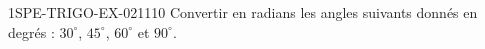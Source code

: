 \begin{exercice}{1SPE-TRIGO-EX-021}{1}{10}
Convertir en radians les angles suivants donnés en degrés : $30^\circ$, $45^\circ$, $60^\circ$ et $90^\circ$.
\end{exercice}

%
